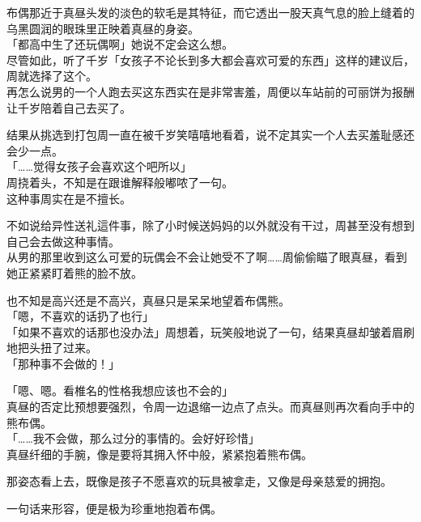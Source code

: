 布偶那近于真昼头发的淡色的软毛是其特征，而它透出一股天真气息的脸上缝着的乌黑圆润的眼珠里正映着真昼的身姿。\\

「都高中生了还玩偶啊」她说不定会这么想。\\

尽管如此，听了千岁「女孩子不论长到多大都会喜欢可爱的东西」这样的建议后，周就选择了这个。\\

再怎么说男的一个人跑去买这东西实在是非常害羞，周便以车站前的可丽饼为报酬让千岁陪着自己去买了。

结果从挑选到打包周一直在被千岁笑嘻嘻地看着，说不定其实一个人去买羞耻感还会少一点。\\

「……觉得女孩子会喜欢这个吧所以」\\

周挠着头，不知是在跟谁解释般嘟哝了一句。\\

这种事周实在是不擅长。

不如说给异性送礼這件事，除了小时候送妈妈的以外就没有干过，周甚至没有想到自己会去做这种事情。\\

从男的那里收到这么可爱的玩偶会不会让她受不了啊……周偷偷瞄了眼真昼，看到她正紧紧盯着熊的脸不放。

也不知是高兴还是不高兴，真昼只是呆呆地望着布偶熊。\\

「嗯，不喜欢的话扔了也行」\\

「如果不喜欢的话那也没办法」周想着，玩笑般地说了一句，结果真昼却皱着眉刷地把头扭了过来。\\

「那种事不会做的！」

「嗯、嗯。看椎名的性格我想应该也不会的」\\

真昼的否定比预想要强烈，令周一边退缩一边点了点头。而真昼则再次看向手中的熊布偶。\\

「……我不会做，那么过分的事情的。会好好珍惜」\\

真昼纤细的手腕，像是要将其拥入怀中般，紧紧抱着熊布偶。

那姿态看上去，既像是孩子不愿喜欢的玩具被拿走，又像是母亲慈爱的拥抱。

一句话来形容，便是极为珍重地抱着布偶。\\

